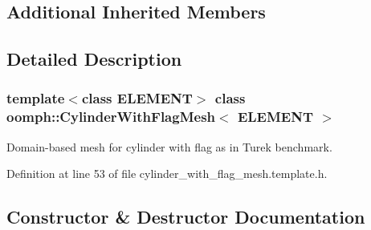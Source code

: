 \subsection*{Additional Inherited Members}


\subsection{Detailed Description}
\subsubsection*{template$<$class E\+L\+E\+M\+E\+NT$>$\newline
class oomph\+::\+Cylinder\+With\+Flag\+Mesh$<$ E\+L\+E\+M\+E\+N\+T $>$}

Domain-\/based mesh for cylinder with flag as in Turek benchmark. 

Definition at line 53 of file cylinder\+\_\+with\+\_\+flag\+\_\+mesh.\+template.\+h.



\subsection{Constructor \& Destructor Documentation}
\mbox{\label{classoomph_1_1CylinderWithFlagMesh_a6591a2b9fdcb8080c899e34b9c8277cd}} 
